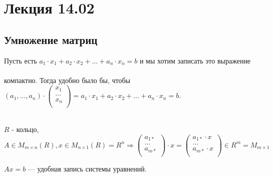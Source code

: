 \section{Лекция 14.02}\label{1}

\subsection{Умножение матриц}
\quad
\begin{remark}
    Пусть есть $a_1 \cdot x_1 + a_2 \cdot x_2 + \dots + a_n \cdot x_n = b$ и мы хотим записать это выражение \\ \\ компактно.
    Тогда удобно было бы, чтобы $(a_1, \dots, a_n) \cdot 
    \begin{pmatrix}
        x_1\\
        \dots\\
        x_n\\
    \end{pmatrix} = a_1 \cdot x_1 + a_2 \cdot x_2 + \dots + a_n \cdot x_n = b$.\\
\end{remark}

\begin{definition}
    \\
    $R$ - кольцо, $A \in M_{m \times n}(R), x \in M_{n \times 1}(R) = R^n \Longrightarrow
    \begin{pmatrix}
        a_{1*}\\
        \dots\\
        a_{m*}\\
    \end{pmatrix} \cdot x =   \begin{pmatrix}
        a_{1*} \cdot x\\
        \dots\\
        a_{m*} \cdot x\\
    \end{pmatrix} \in R ^ m = M_{m \times 1}$ 
\end{definition}

\quad
\begin{remark}
    $Ax = b$ --- удобная запись системы уравнений.
\end{remark}

